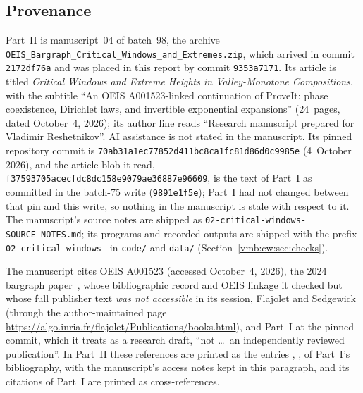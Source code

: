 \documentclass[11pt,a4paper]{article}
\numberwithin{equation}{section}
\theoremstyle{definition}\newtheorem{definition}[theorem]{Definition}
\theoremstyle{remark}\newtheorem{remark}[theorem]{Remark}
\begin{document}
\subsection{Provenance}
\label{vmb:cw:sec:provenance}
Part~II is manuscript~04 of batch~98, the archive
\nolinkurl{OEIS_Bargraph_Critical_Windows_and_Extremes.zip}, which arrived in
commit \texttt{2172df76a} and was placed in this report by commit
\texttt{9353a7171}. Its article is titled \emph{Critical Windows and Extreme
Heights in Valley-Monotone Compositions}, with the subtitle ``An OEIS
A001523-linked continuation of ProveIt: phase coexistence, Dirichlet laws,
and invertible exponential expansions'' (24~pages, dated October~4, 2026);
its author line reads ``Research manuscript prepared for Vladimir
Reshetnikov''. AI assistance is not stated in the manuscript. Its pinned
repository commit is \texttt{70ab31a1ec77852d411bc8ca1fc81d86d0c9985e}
(4~October 2026), and the article blob it read,
\texttt{f37593705acecfdc8dc158e9079ae36887e96609}, is the text of Part~I as
committed in the batch-75 write (\texttt{9891e1f5e}); Part~I had not changed
between that pin and this write, so nothing in the manuscript is stale with
respect to it. The manuscript's source notes are shipped as
\texttt{02-critical-windows-SOURCE\_NOTES.md}; its programs and recorded
outputs are shipped with the prefix \texttt{02-critical-windows-} in
\texttt{code/} and \texttt{data/} (Section~\ref{vmb:cw:sec:checks}).

The manuscript cites OEIS A001523 (accessed October~4, 2026), the 2024
bargraph paper~\cite{FRV}, whose bibliographic record and OEIS linkage it
checked but whose full publisher text \emph{was not accessible} in its
session, Flajolet and Sedgewick~\cite{FS} (through the author-maintained page
\url{https://algo.inria.fr/flajolet/Publications/books.html}), and Part~I at
the pinned commit, which it treats as a research draft, ``not \ldots\ an
independently reviewed publication''. In Part~II these references are printed
as the entries \cite{OEIS}, \cite{FRV}, \cite{FS} of Part~I's bibliography,
with the manuscript's access notes kept in this paragraph, and its citations
of Part~I are printed as cross-references.
\end{document}
